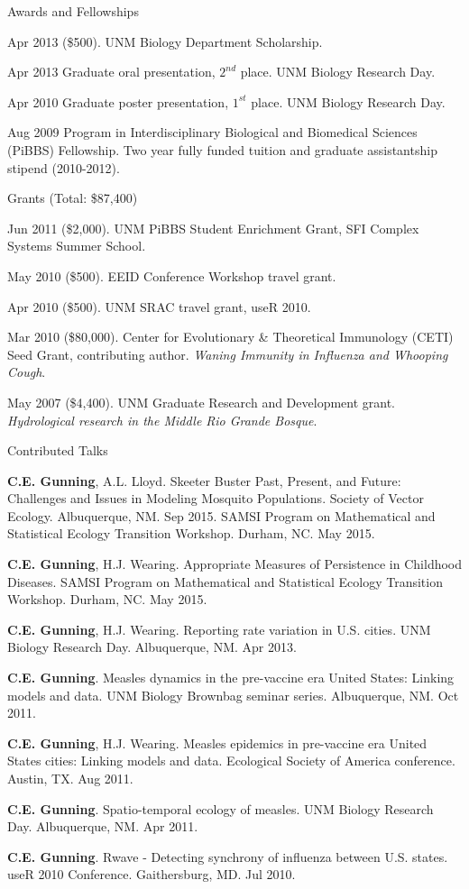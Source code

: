 \documentclass{resume} %
\begin{document}
\clearpage
\begin{rSection}{Awards and Fellowships}
\item Apr 2013 (\$500). UNM Biology Department Scholarship.
\item Apr 2013 Graduate oral presentation, $2^{nd}$ place. UNM Biology Research Day.
\item Apr 2010 Graduate poster presentation, $1^{st}$ place. UNM Biology Research Day.
\item Aug 2009 Program in Interdisciplinary Biological and Biomedical Sciences
(PiBBS) Fellowship. Two year fully funded tuition and graduate assistantship
stipend (2010-2012).
\end{rSection}

\begin{rSection}{Grants (Total: \$87,400)}
\item Jun 2011 (\$2,000). UNM PiBBS Student Enrichment Grant, SFI Complex Systems Summer School.
\item May 2010 (\$500). EEID Conference Workshop travel grant.
\item Apr 2010 (\$500). UNM SRAC travel grant, useR 2010.
\item Mar 2010 (\$80,000). Center for Evolutionary \& Theoretical Immunology (CETI) Seed
Grant, contributing author. {\em Waning Immunity in Influenza and Whooping Cough}.
\item May 2007 (\$4,400). UNM Graduate Research and Development grant. {\em Hydrological research in the Middle Rio Grande Bosque}. 
\end{rSection}

\begin{rSection}{Contributed Talks}
\item {\bf C.E. Gunning}, A.L. Lloyd.  Skeeter Buster Past, Present, and Future: Challenges and Issues in Modeling Mosquito Populations.
Society of Vector Ecology. Albuquerque, NM. Sep 2015.
SAMSI Program on Mathematical and Statistical Ecology Transition Workshop. Durham, NC. May 2015.
\item {\bf C.E. Gunning}, H.J. Wearing.  Appropriate Measures of Persistence in Childhood Diseases.
SAMSI Program on Mathematical and Statistical Ecology Transition Workshop. Durham, NC. May 2015.
\item {\bf C.E. Gunning}, H.J. Wearing.  Reporting rate variation in U.S. cities.
UNM Biology Research Day. Albuquerque, NM. Apr 2013.
\item {\bf C.E. Gunning}.  Measles dynamics in the pre-vaccine era United States: Linking
models and data. UNM Biology Brownbag seminar series. Albuquerque, NM. Oct 2011.
\item {\bf C.E. Gunning}, H.J. Wearing.  Measles epidemics in pre-vaccine era United States cities: Linking models and data. Ecological Society of America conference. Austin, TX. Aug 2011.
\item {\bf C.E. Gunning}.  Spatio-temporal ecology of measles. 
UNM Biology Research Day. Albuquerque, NM. Apr 2011.
\item {\bf C.E. Gunning}. Rwave - Detecting synchrony of influenza between U.S. states.
useR 2010 Conference. Gaithersburg, MD. Jul 2010.
\end{rSection}
\end{document}
